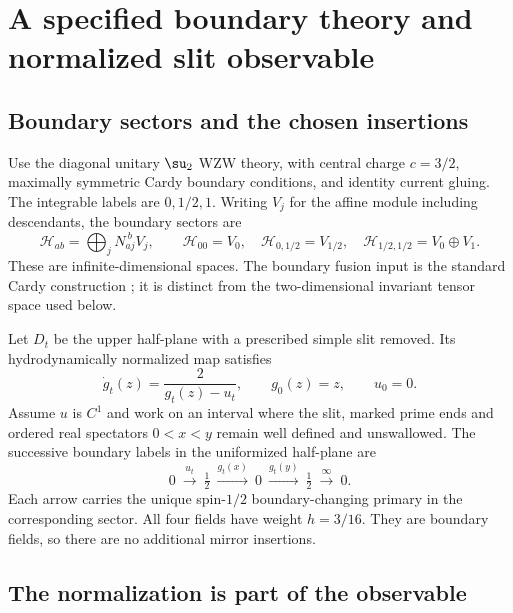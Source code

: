 \section{A specified boundary theory and normalized slit observable}
\label{sec:boundary}

\subsection{Boundary sectors and the chosen insertions}

Use the diagonal unitary $\su_2$ WZW theory, with central charge $c=3/2$,
maximally symmetric Cardy boundary conditions, and identity current gluing.
The integrable labels are $0,1/2,1$. Writing $V_j$ for the affine module
including descendants, the boundary sectors are
\begin{equation}
 \mathcal H_{ab}=\bigoplus_j N_{aj}^{\ b}V_j,
 \qquad \mathcal H_{00}=V_0,\quad
 \mathcal H_{0,1/2}=V_{1/2},\quad
 \mathcal H_{1/2,1/2}=V_0\oplus V_1.
 \label{eq:sectors}
\end{equation}
These are infinite-dimensional spaces. The boundary fusion input is the
standard Cardy construction \cite{Cardy,BPPZ}; it is distinct from the
two-dimensional invariant tensor space used below.

Let $D_t$ be the upper half-plane with a prescribed simple slit removed.
Its hydrodynamically normalized map satisfies
\begin{equation}
 \dot g_t(z)=\frac{2}{g_t(z)-u_t},\qquad g_0(z)=z,\qquad u_0=0.
 \label{eq:chordal}
\end{equation}
Assume $u$ is $C^1$ and work on an interval where the slit, marked prime
ends and ordered real spectators $0<x<y$ remain well defined and unswallowed.
The successive boundary labels in the uniformized half-plane are
\begin{equation}
 0\ \xrightarrow{u_t}\ \tfrac12
 \ \xrightarrow{g_t(x)}\ 0
 \ \xrightarrow{g_t(y)}\ \tfrac12
 \ \xrightarrow{\infty}\ 0.
 \label{eq:labels}
\end{equation}
Each arrow carries the unique spin-$1/2$ boundary-changing primary in the
corresponding sector. All four fields have weight $h=3/16$. They are
boundary fields, so there are no additional mirror insertions.

\subsection{The normalization is part of the observable}

